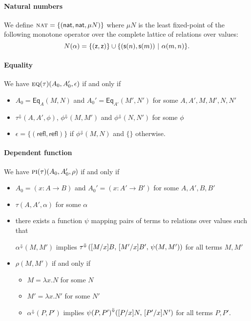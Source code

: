 \documentclass{article} \usepackage{chtt-notes} \usepackage{stmaryrd}
\newcommand{\lift}[1]{{#1}^{\Downarrow}}
\begin{document}
\paragraph{Natural numbers}
We define $ \textsc{nat} = \{(\mathsf{nat}, \mathsf{nat}, \mu N)\} $ where $\mu N$ is
the least fixed-point of the following monotone operator over the
complete lattice of relations over values:
\[ N(\alpha) = \{(\mathsf{z}, \mathsf{z})\} \cup \{ (\mathsf{s}(n), \mathsf{s}(m)) \ | \
  \alpha(m,n) \}. \]

\paragraph{Equality}
We have $\textsc{eq}(\tau)(A_0, A'_0, \epsilon)$ if and only if
\begin{itemize}
\item $A_0 = \textsf{Eq}_A(M, N)$ and
  $A_0' = \textsf{Eq}_{A'}(M', N')$ for some $A, A', M, M', N, N'$
\item $\lift{\tau}(A, A', \phi)$, $\lift{\phi}(M, M')$ and
  $\lift{\phi}(N, N')$ for some $\phi$
\item $\epsilon = \{(\textsf{refl}, \textsf{refl})\}$ if $\lift{\phi}(M,N)$
  and $\{\}$ otherwise.
\end{itemize}

\paragraph{Dependent function}
We have $\textsc{pi}(\tau)(A_0, A'_0, \rho)$ if and only if
\begin{itemize}
\item $A_0 = (x:A \to B)$ and $A_0' = (x:A' \to B')$ for some
  $A,A',B,B'$
\item $\tau(A, A', \alpha)$ for some $\alpha$
\item there exists a function $\psi$ mapping pairs of terms to
  relations over values such that
  \begin{center}
    $\lift{\alpha}(M, M')$ implies
    $\lift{\tau}\left(\subst{M}{x}{B}, \, \subst{M'}{x}{B'}, \,
      \psi(M,M')\right)$ for all terms $M, M'$
  \end{center}
\item $\rho(M, M')$ if and only if
  \begin{itemize}
  \item $M = \lambda x. N$ for some $N$
  \item $M' = \lambda x. N'$ for some $N'$
  \item $\lift{\alpha}(P, P')$ implies
    $\lift{\psi(P, P')}(\subst{P}{x}{N}, \, \subst{P'}{x}{N'})$ for
    all terms $P, P'$.
  \end{itemize}
\end{itemize}
\end{document}

